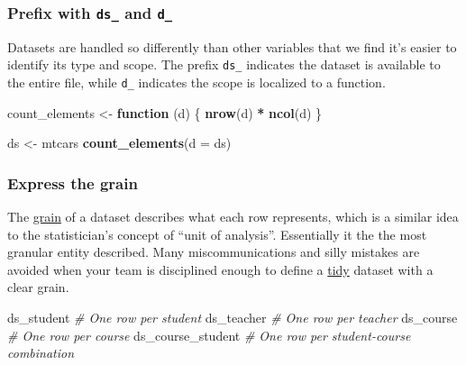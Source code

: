 \documentclass[
]{book}
\newenvironment{Shaded}{\begin{snugshade}}{\end{snugshade}}
\newcommand{\CommentTok}[1]{\textcolor[rgb]{0.56,0.35,0.01}{\textit{#1}}}
\newcommand{\ControlFlowTok}[1]{\textcolor[rgb]{0.13,0.29,0.53}{\textbf{#1}}}
\newcommand{\DataTypeTok}[1]{\textcolor[rgb]{0.13,0.29,0.53}{#1}}
\newcommand{\KeywordTok}[1]{\textcolor[rgb]{0.13,0.29,0.53}{\textbf{#1}}}
\newcommand{\NormalTok}[1]{#1}
\newcommand{\OperatorTok}[1]{\textcolor[rgb]{0.81,0.36,0.00}{\textbf{#1}}}
\newcommand{\StringTok}[1]{\textcolor[rgb]{0.31,0.60,0.02}{#1}}
\begin{document}
\hypertarget{style-naming-datasets-prefix}{%
\subsubsection{\texorpdfstring{Prefix with \texttt{ds\_} and \texttt{d\_}}{Prefix with ds\_ and d\_}}\label{style-naming-datasets-prefix}}

Datasets are handled so differently than other variables that we find it's easier to identify its type and scope. The prefix \texttt{ds\_} indicates the dataset is available to the entire file, while \texttt{d\_} indicates the scope is localized to a function.

\begin{Shaded}
\begin{Highlighting}[]
\NormalTok{count\_elements \textless{}{-}}\StringTok{ }\ControlFlowTok{function}\NormalTok{ (d) \{}
  \KeywordTok{nrow}\NormalTok{(d) }\OperatorTok{*}\StringTok{ }\KeywordTok{ncol}\NormalTok{(d)}
\NormalTok{\}}

\NormalTok{ds \textless{}{-}}\StringTok{ }\NormalTok{mtcars}
\KeywordTok{count\_elements}\NormalTok{(}\DataTypeTok{d =}\NormalTok{ ds)}
\end{Highlighting}
\end{Shaded}

\hypertarget{style-naming-datasets-grain}{%
\subsubsection{Express the grain}\label{style-naming-datasets-grain}}

The \href{https://gerardnico.com/olap/dimensional_modeling/grain\#grain}{grain} of a dataset describes what each row represents, which is a similar idea to the statistician's concept of ``unit of analysis''. Essentially it the the most granular entity described. Many miscommunications and silly mistakes are avoided when your team is disciplined enough to define a \href{https://r4ds.had.co.nz/tidy-data.html}{tidy} dataset with a clear grain.

\begin{Shaded}
\begin{Highlighting}[]
\NormalTok{ds\_student          }\CommentTok{\# One row per student}
\NormalTok{ds\_teacher          }\CommentTok{\# One row per teacher}
\NormalTok{ds\_course           }\CommentTok{\# One row per course}
\NormalTok{ds\_course\_student   }\CommentTok{\# One row per student{-}course combination}
\end{Highlighting}
\end{Shaded}
\end{document}
